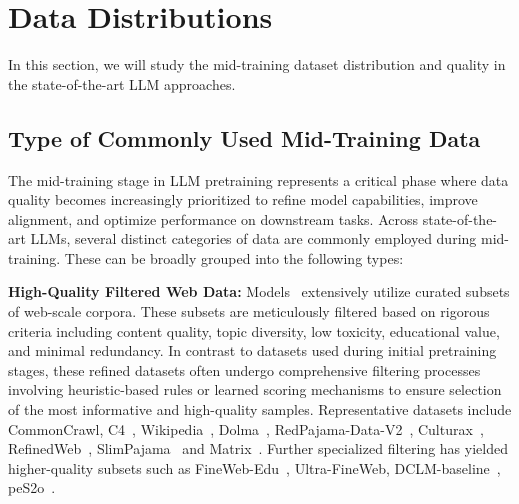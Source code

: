 \section{Data Distributions}
\label{sec:data}
In this section, we will study the mid-training dataset distribution and quality in the state-of-the-art LLM approaches.


\subsection{Type of Commonly Used Mid-Training Data}
The mid-training stage in LLM pretraining represents a critical phase where data quality becomes increasingly prioritized to refine model capabilities, improve alignment, and optimize performance on downstream tasks. Across state-of-the-art LLMs, several distinct categories of data are commonly employed during mid-training. These can be broadly grouped into the following types:



\noindent\textbf{High-Quality Filtered Web Data:}
Models~\cite{hu2024minicpm, sun2024hunyuan, Dubey2024TheL3, allal2025smollm2, olmo20242, abdin2024phi} extensively utilize curated subsets of web-scale corpora. 
These subsets are meticulously filtered based on rigorous criteria including content quality, topic diversity, low toxicity, educational value, and minimal redundancy. In contrast to datasets used during initial pretraining stages, these refined datasets often undergo comprehensive filtering processes involving heuristic-based rules or learned scoring mechanisms to ensure selection of the most informative and high-quality samples.
Representative datasets include CommonCrawl, C4~\cite{C4dataset}, Wikipedia~\cite{wikidump}, Dolma~\cite{soldaini2024dolma}, RedPajama-Data-V2~\cite{together2023redpajama}, Culturax~\cite{nguyen2023culturax}, RefinedWeb~\cite{penedo2023refinedweb}, SlimPajama~\cite{shen2023slimpajama} and Matrix~\cite{Zhang2024MAPNeoHC}. Further specialized filtering has yielded higher-quality subsets such as FineWeb-Edu~\cite{penedo2024fineweb}, Ultra-FineWeb, DCLM-baseline~\cite{NEURIPS2024_19e4ea30}, peS2o~\cite{peS2o}.

